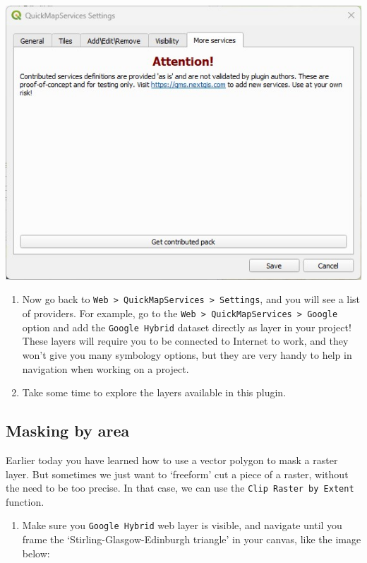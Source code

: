 \documentclass[
  letterpaper,
  DIV=11,
  numbers=noendperiod]{scrreprt}
\providecommand{\tightlist}{%
  \setlength{\itemsep}{0pt}\setlength{\parskip}{0pt}}\usepackage{longtable,booktabs,array}
\begin{document}
\includegraphics{images/lab_5/lab5_fig3_moremaps.jpg}

\begin{enumerate}
\def\labelenumi{(\arabic{enumi})}
\setcounter{enumi}{145}
\item
  Now go back to
  \texttt{Web\ \textgreater{}\ QuickMapServices\ \textgreater{}\ Settings},
  and you will see a list of providers. For example, go to the
  \texttt{Web\ \textgreater{}\ QuickMapServices\ \textgreater{}\ Google}
  option and add the \texttt{Google\ Hybrid} dataset directly as layer
  in your project! These layers will require you to be connected to
  Internet to work, and they won't give you many symbology options, but
  they are very handy to help in navigation when working on a project.
\item
  Take some time to explore the layers available in this plugin.
\end{enumerate}

\subsection{Masking by area}\label{masking-by-area}

Earlier today you have learned how to use a vector polygon to mask a
raster layer. But sometimes we just want to `freeform' cut a piece of a
raster, without the need to be too precise. In that case, we can use the
\texttt{Clip\ Raster\ by\ Extent} function.

\begin{enumerate}
\def\labelenumi{(\arabic{enumi})}
\setcounter{enumi}{147}
\tightlist
\item
  Make sure you \texttt{Google\ Hybrid} web layer is visible, and
  navigate until you frame the `Stirling-Glasgow-Edinburgh triangle' in
  your canvas, like the image below:
\end{enumerate}
\end{document}
